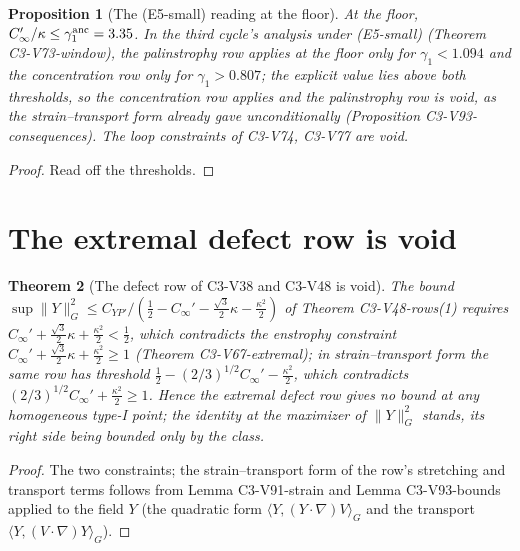 \documentclass[11pt]{article}
\theoremstyle{plain}
\newtheorem{theorem}{Theorem}[section]
\newtheorem{proposition}[theorem]{Proposition}
\theoremstyle{definition}
\theoremstyle{remark}
\begin{document}
\begin{proposition}[The (E5-small) reading at the floor]
\label{prop:c4v13-E5}
At the floor, \(C_\infty'/\kappa\le\gamma_1^{\rm anc}=3.35\).  In the third cycle's analysis under
(E5-small) (Theorem C3-V73-window), the palinstrophy row applies at
the floor only for \(\gamma_1<1.094\) and the concentration row only for
\(\gamma_1>0.807\); the explicit value lies above both thresholds, so the
concentration row applies and the palinstrophy row is void, as the
strain--transport form already gave unconditionally
(Proposition C3-V93-consequences).  The loop constraints of C3-V74,
C3-V77 are void.
\end{proposition}

\begin{proof}
Read off the thresholds.
\end{proof}

\section{The extremal defect row is void}
\label{sec:c4v13-defect}

\begin{theorem}[The defect row of C3-V38 and C3-V48 is void]
\label{thm:c4v13-void}
The bound \(\sup\|Y\|_G^2\le C_{YP'}/(\frac12-C_\infty'-\frac{\sqrt3}2\kappa-\frac{\kappa^2}2)\) of Theorem
C3-V48-rows(1) requires \(C_\infty'+\frac{\sqrt3}2\kappa+\frac{\kappa^2}2<\frac12\), which contradicts the
enstrophy constraint \(C_\infty'+\frac{\sqrt3}2\kappa+\frac{\kappa^2}2\ge1\) (Theorem C3-V67-extremal);
in strain--transport form the same row has threshold
\(\frac12-(2/3)^{1/2}C_\infty'-\frac{\kappa^2}2\), which contradicts \((2/3)^{1/2}C_\infty'+\frac{\kappa^2}2\ge1\).  Hence the
extremal defect row gives no bound at any homogeneous type-I point;
the identity at the maximizer of \(\|Y\|_G^2\) stands, its right side
being bounded only by the class.
\end{theorem}

\begin{proof}
The two constraints; the strain--transport form of the row's
stretching and transport terms follows from Lemma C3-V91-strain
and Lemma C3-V93-bounds applied to the field \(Y\) (the quadratic form
\(\langle Y,(Y\cdot\nabla)V\rangle_G\) and the transport \(\langle Y,(V\cdot\nabla)Y\rangle_G\)).
\end{proof}
\end{document}
